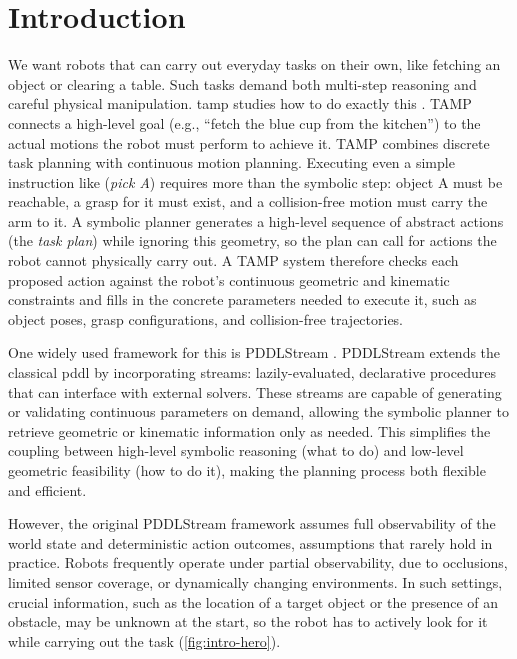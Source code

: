 
\chapter{Introduction}
\label{ch:introduction}
We want robots that can carry out everyday tasks on their own, like fetching an object or clearing a table. Such tasks demand both multi-step reasoning and careful physical manipulation. \Ac{tamp} studies how to do exactly this \cite{garrett2021integrated, garrett2018pddlstream, curtis2024partially}.
TAMP connects a high-level goal (e.g., ``fetch the blue cup from the kitchen'') to the actual motions the robot must perform to achieve it.
TAMP combines discrete task planning with continuous motion planning. Executing even a simple instruction like (\textit{pick A}) requires more than the symbolic step: object A must be reachable, a grasp for it must exist, and a collision-free motion must carry the arm to it. A symbolic planner generates a high-level sequence of abstract actions (the \emph{task plan}) while ignoring this geometry, so the plan can call for actions the robot cannot physically carry out. A TAMP system therefore checks each proposed action against the robot's continuous geometric and kinematic constraints and fills in the concrete parameters needed to execute it, such as object poses, grasp configurations, and collision-free trajectories.

One widely used framework for this is PDDLStream \cite{garrett2018pddlstream}. PDDLStream extends the classical \ac{pddl} \cite{aeronautiques1998pddl} by incorporating streams: lazily-evaluated, declarative procedures that can interface with external solvers. These streams are capable of generating or validating continuous parameters on demand, allowing the symbolic planner to retrieve geometric or kinematic information only as needed. This simplifies the coupling between high-level symbolic reasoning (what to do) and low-level geometric feasibility (how to do it), making the planning process both flexible and efficient.

However, the original PDDLStream framework assumes full observability of the world state and deterministic action outcomes, assumptions that rarely hold in practice. Robots frequently operate under partial observability, due to occlusions, limited sensor coverage, or dynamically changing environments. In such settings, crucial information, such as the location of a target object or the presence of an obstacle, may be unknown at the start, so the robot has to actively look for it while carrying out the task (\cref{fig:intro-hero}).

